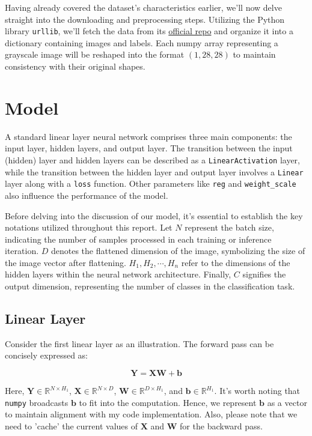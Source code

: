 \documentclass[10pt,a4paper,twoside]{tau}
\renewcommand{\vec}[1]{\mathbf{#1}}
\begin{document}
Having already covered the dataset's characteristics earlier, we'll now delve straight into the downloading and preprocessing steps. Utilizing the Python library \texttt{urllib}, we'll fetch the data from its \href{https://github.com/zalandoresearch/fashion-mnist}{official repo} and organize it into a dictionary containing images and labels. Each numpy array representing a grayscale image will be reshaped into the format $(1, 28, 28)$ to maintain consistency with their original shapes.

\section{Model}

A standard linear layer neural network comprises three main components: the input layer, hidden layers, and output layer. The transition between the input (hidden) layer and hidden layers can be described as a \texttt{LinearActivation} layer, while the transition between the hidden layer and output layer involves a \texttt{Linear} layer along with a \texttt{loss} function. Other parameters like \texttt{reg} and \texttt{weight\_scale} also influence the performance of the model.

Before delving into the discussion of our model, it's essential to establish the key notations utilized throughout this report. Let $N$ represent the batch size, indicating the number of samples processed in each training or inference iteration. $D$ denotes the flattened dimension of the image, symbolizing the size of the image vector after flattening. $H_1, H_2, \cdots, H_n$ refer to the dimensions of the hidden layers within the neural network architecture. Finally, $C$ signifies the output dimension, representing the number of classes in the classification task.

\subsection{Linear Layer}

Consider the first linear layer as an illustration. The forward pass can be concisely expressed as:

\begin{equation}
    \vec{Y} = \vec{X}\vec{W} + \vec{b} \tag{3.1.1}
\end{equation}

Here, $\vec{Y} \in \mathbb{R}^{N \times H_1}$, $\vec{X} \in \mathbb{R}^{N \times D}$, $\vec{W} \in \mathbb{R}^{D \times H_1}$, and $\vec{b} \in \mathbb{R}^{H_1}$. It's worth noting that \texttt{numpy} broadcasts $\vec{b}$ to fit into the computation. Hence, we represent $\vec{b}$ as a vector to maintain alignment with my code implementation. Also, please note that we need to 'cache' the current values of $\vec{X}$ and $\vec{W}$ for the backward pass.
\end{document}
